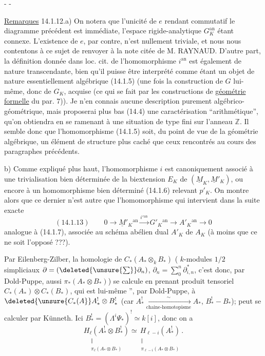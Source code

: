 \begin{center}-  -\end{center}
\uline{Remarques} 14.1.12.\quad a) On notera que l'unicité de $e$ rendant commutatif
le diagramme précédent est immédiate, l'espace rigide-analytique $G_K^{\mathrm{an}}$
étant connexe. L'existence de $e$, par contre, n'est nullement triviale,
et nous nous contentons à ce sujet de renvoyer à la note citée de
M. RAYNAUD. D'autre part, la définition donnée dans loc. cit. de
l'homomorphisme $i^{\mathrm{an}}$ est également de nature transcendante, bien qu'il
puisse être interprété comme étant un objet de nature essentiellement
algébrique (14.1.5) (une fois la construction de $G$ lui-même, donc de
$G_K$, acquise (ce qui se fait par les constructions de \uline{géométrie formelle}
du par. 7)). Je n'en connais aucune description purement algébrico-géométrique,
mais proposerai plus bas (14.4) une caractérisation
``arithmétique'', qu'on obtiendra en se ramenant à une situation de type
fini sur l'anneau $\mathbb Z$. Il semble donc que l'homomorphisme (14.1.5) soit,
du point de vue de la géométrie algébrique, un élément de structure
plus caché que ceux rencontrés au cours des paragraphes précédents.

b) Comme expliqué plus haut, l'homomorphisme $i$ est canoniquement
associé à une trivialisation bien déterminée de la biextension $E_K$ de
$(\underline M_K,\underline M'_K)$, ou encore à un homomorphisme bien déterminé (14.1.6) relevant $p'_K$.
On montre alors que ce dernier n'est autre que l'homomorphisme qui
intervient dans la suite exacte
\[
(14.1.13)\qquad0\longrightarrow\underline M'_K{}^{\mathrm{an}}
\xrightarrow{i'{}^{\mathrm{an}}}G'_K{}^{\mathrm{an}}\longrightarrow A'_K{}^{\mathrm{an}}\longrightarrow0
\]
analogue à (14.1.7), associée au schéma abélien dual $A'_K$ de $A_K$ (à moins
que ce ne soit l'opposé ???).

Par Eilenberg-Zilber, la homologie de
$C_*(A_*\otimes_k B_*)$ (
$k$-modules $1/2$ simpliciaux \deleted{$\unsure{\Phi_*\longrightarrow}$}
$\partial=(\deleted{\unsure{\sum}}\partial_n)$,
$\partial_n=\sum_0^n\partial^*_{i,n}$,
c'est donc, par Dold-Puppe, aussi $\pi_*(A_*\otimes B_*)$)
se calcule en prenant  produit tensoriel
 $C_*(A_*)\otimes C_*(B_*)$, qui est lui-même
'', par Dold-Puppe, à
$\deleted{\unsure{C_*(A}}A_*^!\otimes B_*^!$
(car $A_*^!\xrightarrow[\text{chaine-homotopisme}]{\sim}A_*$,
$B_*^!\mathbin{-}B_*$);
 peut se calculer par Künneth.
Ici $B_*^!=(\Lambda^i\Psi_*)^!\simeq k[i]$, donc on  a
\[
\underset{\substack{\Vert\\\pi_\ell(A_*\otimes B_*)}}{H_\ell(A_*^!\otimes B_*^!)}
\simeq
\underset{\substack{\Vert\\\pi_{\ell-i}(A_*\otimes B_*)}}{H_{\ell-i}(A_*^!)}.
\]

